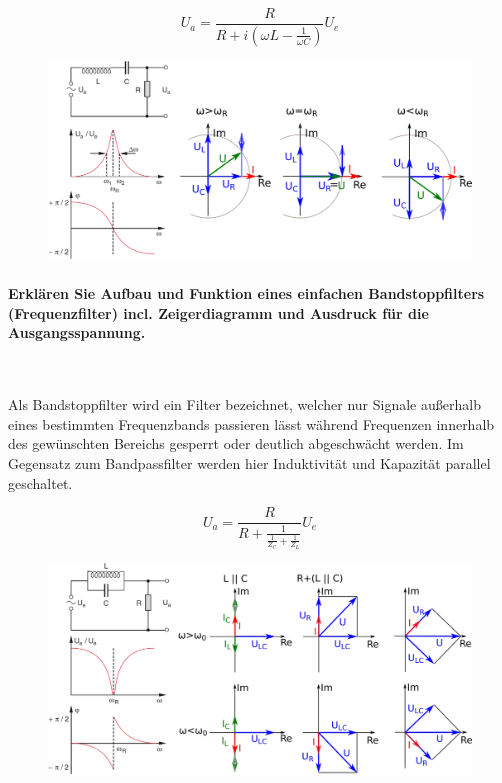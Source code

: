 \documentclass[a4paper, 11pt, parskip=half]{scrartcl}
\begin{document}
\begin{equation}
    U_a = \frac{R}{R + i \left( \omega L - \frac{1}{\omega C} \right)} U_e
\end{equation}
\begin{figure}[H]
    \centering
    \includegraphics[width=12cm]{image/10/5}
\end{figure}

\paragraph{Erklären Sie Aufbau und Funktion eines einfachen Bandstoppfilters (Frequenzfilter) incl.
Zeigerdiagramm und Ausdruck für die Ausgangsspannung.} ~

Als Bandstoppfilter wird ein Filter bezeichnet, welcher nur Signale außerhalb eines bestimmten
Frequenzbands passieren lässt während Frequenzen innerhalb des gewünschten Bereichs gesperrt oder
deutlich abgeschwächt werden. Im Gegensatz zum Bandpassfilter werden hier Induktivität und
Kapazität parallel geschaltet.

\begin{equation}
    U_a = \frac{R}{R + \frac{1}{\frac{1}{Z_C} + \frac{1}{Z_L}}} U_e
\end{equation}
\begin{figure}[H]
    \centering
    \includegraphics[width=12cm]{image/10/6}
\end{figure}
\end{document}
